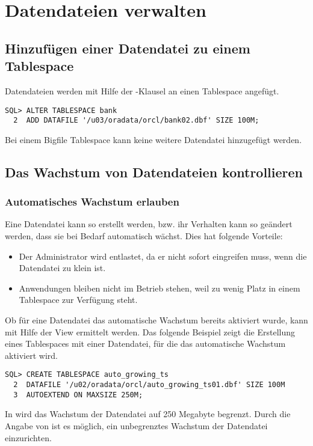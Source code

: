     \section{Datendateien verwalten}
      \subsection{Hinzuf\"ugen einer Datendatei zu einem Tablespace}
        Datendateien werden mit Hilfe der -Klausel an einen Tablespace angef\"ugt.
        \begin{lstlisting}[caption={Hinzuf\"ugen einer Datendatei},label=admin122,language=oracle_sql]
SQL> ALTER TABLESPACE bank
  2  ADD DATAFILE '/u03/oradata/orcl/bank02.dbf' SIZE 100M;
        \end{lstlisting}
        \begin{merke}
          Bei einem Bigfile Tablespace kann keine weitere Datendatei hinzugef\"ugt werden.
        \end{merke}
      \subsection{Das Wachstum von Datendateien kontrollieren}
        \subsubsection{Automatisches Wachstum erlauben}
          Eine Datendatei kann so erstellt werden, bzw. ihr Verhalten kann so ge\"andert werden, dass sie bei Bedarf automatisch w\"achst. Dies hat folgende Vorteile:
          \begin{itemize}
            \item Der Administrator wird entlastet, da er nicht sofort eingreifen muss, wenn die Datendatei zu klein ist.
            \item Anwendungen bleiben nicht im Betrieb stehen, weil zu wenig Platz in einem Tablespace zur Verf\"ugung steht.
          \end{itemize}
          Ob f\"ur eine Datendatei das automatische Wachstum bereits aktiviert wurde, kann mit Hilfe der View  ermittelt werden. Das folgende Beispiel zeigt die Erstellung eines Tablespaces mit einer Datendatei, f\"ur die das automatische Wachstum aktiviert wird.
          \begin{lstlisting}[caption={Erstellen eines Tablespaces mit automatisch wachsender Datendatei},label=admin123,language=oracle_sql]
SQL> CREATE TABLESPACE auto_growing_ts
  2  DATAFILE '/u02/oradata/orcl/auto_growing_ts01.dbf' SIZE 100M
  3  AUTOEXTEND ON MAXSIZE 250M;
          \end{lstlisting}
          In  wird das Wachstum der Datendatei auf 250 Megabyte begrenzt. Durch die Angabe von  ist es m\"oglich, ein unbegrenztes Wachstum der Datendatei einzurichten.

